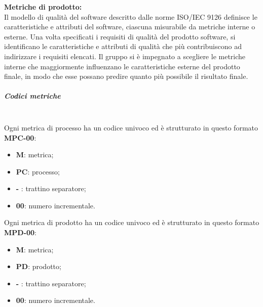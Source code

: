 \textbf{Metriche di prodotto:}\\
Il modello di qualità del software descritto dalle norme ISO/IEC 9126 definisce le caratteristiche e attributi del software, ciascuna misurabile da metriche interne o esterne.
Una volta specificati i requisiti di qualità del prodotto software, si identificano le caratteristiche e attributi di qualità che più contribuiscono ad indirizzare i requisiti elencati.
Il gruppo \Gruppo{} si è impegnato a scegliere le metriche interne che maggiormente influenzano le caratteristiche esterne del prodotto finale, in modo che esse possano predire quanto più possibile il risultato finale.

\subparagraph{Codici metriche}\mbox{}\\
Ogni metrica di processo ha un codice univoco ed è strutturato in questo formato \textbf{MPC-00}:
\begin{itemize}
    \item \textbf{M}: metrica;
    \item \textbf{PC}: processo;
    \item \textbf{-} : trattino separatore;
    \item \textbf{00}: numero incrementale.
\end{itemize}
Ogni metrica di prodotto ha un codice univoco ed è strutturato in questo formato \textbf{MPD-00}:
\begin{itemize}
    \item \textbf{M}: metrica;
    \item \textbf{PD}: prodotto;
    \item \textbf{-} : trattino separatore;
    \item \textbf{00}: numero incrementale.
\end{itemize}

